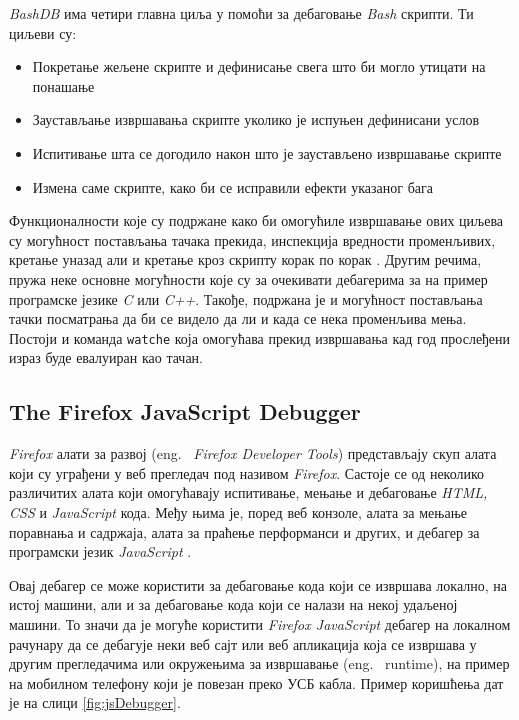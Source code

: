 \documentclass[a4paper]{article}
\begin{document}
{\em BashDB} има четири главна циља у помоћи за дебаговање
{\em Bash} скрипти. Ти циљеви су:

\begin{itemize}
 \item Покретање жељене скрипте и дефинисање свега што би могло утицати на понашање
 \item Заустављање извршавања скрипте уколико је испуњен дефинисани услов
 \item Испитивање шта се догодило након што је заустављено извршавање скрипте
 \item Измена саме скрипте, како би се исправили ефекти указаног бага
\end{itemize}

Функционалности које су подржане како би омогућиле извршавање
ових циљева су могућност постављања тачака прекида, инспекција
вредности променљивих, кретање уназад али и кретање кроз скрипту
корак по корак \cite{bashDB}. Другим речима, пружа неке основне могућности које су
за очекивати дебагерима за на пример програмске језике {\em C} или {\em C++}.
Такође, подржана је и могућност постављања тачки посматрања да би се
видело да ли и када се нека променљива мења. Постоји и команда
\texttt{watche} која омогућава прекид извршавања кад год прослеђени израз
буде евалуиран као тачан.

\subsection{The Firefox JavaScript Debugger}

{\em Firefox} алати за развој (eng. ~{\em Firefox Developer Tools})
представљају скуп алата који су уграђени у веб прегледач под
називом {\em Firefox}. Састоје се од неколико различитих алата који
омогућавају испитивање, мењање и дебаговање {\em HTML, CSS} и 
{\em JavaScript} кода. Међу њима је, поред веб конзоле, алата за
мењање поравнања и садржаја, алата за праћење перформанси и других,
и дебагер за програмски језик {\em JavaScript} \cite{jsDevTools}.

Овај дебагер се може користити за дебаговање кода који се извршава 
локално, на истој машини, али и за дебаговање кода који се налази 
на некој удаљеној машини. То значи да је могуће користити {\em 
Firefox JavaScript} дебагер на локалном рачунару да се дебагује неки веб сајт
или веб апликација која се извршава у другим прегледачима или 
окружењима за извршавање (eng. ~{runtime}), на пример на мобилном
телефону који је повезан преко УСБ кабла. Пример коришћења дат је на
слици \ref{fig:jsDebugger}.
\end{document}
